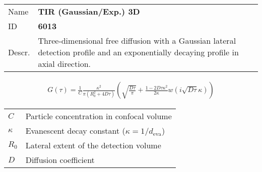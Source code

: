 \noindent \begin{tabular}{lp{}}
Name & \textbf{TIR (Gaussian/Exp.) 3D} \\ 
ID & \textbf{6013} \\ 
Descr. &  Three-dimensional free diffusion with a Gaussian lateral detection profile and an exponentially decaying profile in axial direction\cite{Starr2001, Hassler2005, Ohsugi2006}. \\ 
\end{tabular}
\begin{align}
G(\tau) = \frac{1}{C}  \frac{ \kappa^2}{ \pi (R_0^2 +4D\tau)}
 \left( \sqrt{\frac{D \tau}{\pi}} + \frac{1 - 2 D \tau \kappa^2}{2 \kappa}  w\!\left(i \sqrt{D \tau} \kappa\right) \right)
\end{align} 
\begin{center}
\begin{tabular}{ll}
$C$ & Particle concentration in confocal volume \\ 
$\kappa$ &  Evanescent decay constant ($\kappa = 1/d_\mathrm{eva}$)\\ 
$R_0$ & Lateral extent of the detection volume \\
$D$ & Diffusion coefficient  \\
\end{tabular}
\end{center}
\vspace{2em}


